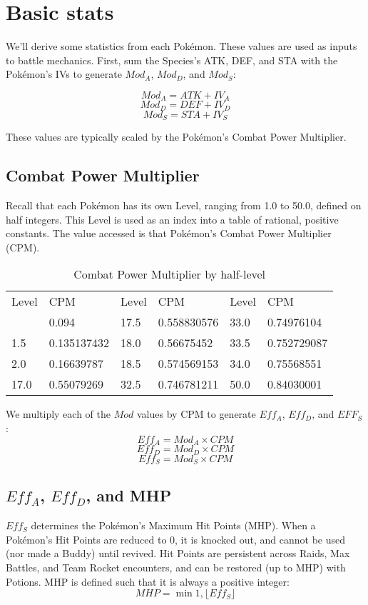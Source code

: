 \chapter{Basic stats}

We'll derive some statistics from each Pokémon.
These values are used as inputs to battle mechanics.
First, sum the Species's ATK, DEF, and STA with the Pokémon's
 IVs to generate $Mod_A$, $Mod_D$, and $Mod_S$:

 \[ Mod_A = ATK + IV_A \]
 \[ Mod_D = DEF + IV_D \]
 \[ Mod_S = STA + IV_S \]

These values are typically scaled by the Pokémon's Combat Power Multiplier.

\section{Combat Power Multiplier}
Recall that each Pokémon has its own Level, ranging from 1.0
 to 50.0, defined on half integers.
This Level is used as an index into a table of rational,
 positive constants.
The value accessed is that Pokémon's Combat Power Multiplier (CPM).

\begin{table}
\begin{tabular}{l l l l l l}
Level & CPM & Level & CPM & Level & CPM \\
\Midrule
1.0 & 0.094 & 17.5 & 0.558830576 & 33.0 & 0.74976104 \\
1.5 & 0.135137432 & 18.0 & 0.56675452 & 33.5 & 0.752729087 \\
2.0 & 0.16639787 & 18.5 & 0.574569153 & 34.0 & 0.75568551 \\
17.0 & 0.55079269 & 32.5 & 0.746781211 & 50.0 & 0.84030001 \\
\end{tabular}
\caption{Combat Power Multiplier by half-level}
\label{table:cpm}
\end{table}


We multiply each of the $Mod$ values by CPM to generate $Eff_A$, $Eff_D$, and $EFF_S$:
\[ Eff_A = Mod_A \times CPM \]
\[ Eff_D = Mod_D \times CPM \]
\[ Eff_S = Mod_S \times CPM \]

\section{$Eff_A$, $Eff_D$, and MHP}
$Eff_S$ determines the Pokémon's Maximum Hit Points (MHP).
When a Pokémon's Hit Points are reduced to 0, it is knocked out, and cannot be
 used (nor made a Buddy) until revived.
Hit Points are persistent across Raids, Max Battles, and Team Rocket encounters,
 and can be restored (up to MHP) with Potions.
MHP is defined such that it is always a positive integer:
\[ MHP = \min{1, \lfloor Eff_S \rfloor} \]
